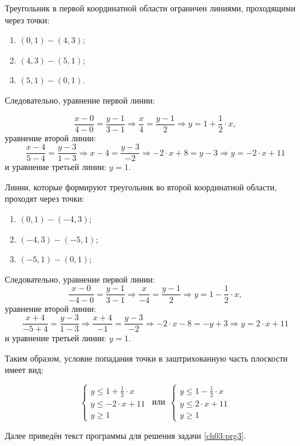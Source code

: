 Треугольник в первой координатной области ограничен линиями, проходящими через точки:

\begin{enumerate}
\item $(0, 1) - (4, 3)$;
\item $(4, 3) - (5, 1)$;
\item $(5, 1) - (0, 1)$.
\end{enumerate}
Следовательно, уравнение первой линии:

 $$\frac{x-0}{4-0}=\frac{y-1}{3-1}\Rightarrow \frac{x}{4}=\frac{y-1}{2}\Rightarrow y=1+\frac{1}{2}\cdot x,$$
уравнение второй линии:
$$
\frac{x-4}{5-4}=\frac{y-3}{1-3}\Rightarrow x-4=\frac{y-3}{-2}\Rightarrow -2\cdot x+8=y-3\Rightarrow y=-2\cdot x+11
$$
и уравнение третьей линии:  $y=1$.

Линии, которые формируют треугольник во второй координатной области, проходят через точки:

\begin{enumerate}
\item $(0, 1) - (-4, 3)$;
\item $(-4, 3) - (-5, 1)$;
\item $(-5, 1) - (0, 1)$;
\end{enumerate}
Следовательно, уравнение первой линии:
 $$\frac{x-0}{-4-0}=\frac{y-1}{3-1}\Rightarrow \frac{x}{-4}=\frac{y-1}{2}\Rightarrow y=1-\frac{1}{2}\cdot x,$$
уравнение второй линии:
$$
\frac{x+4}{-5+4}=\frac{y-3}{1-3}\Rightarrow \frac{x+4}{-1}=\frac{y-3}{-2}\Rightarrow -2\cdot x-8=-y+3\Rightarrow
y=2\cdot x+11
$$
и уравнение третьей линии:  $y=1$.

Таким образом, условие попадания точки в заштрихованную часть плоскости имеет вид:

\begin{equation*}
\left\{
\begin{array}{c}
y\leqslant 1+\frac{1}{2}\cdot x\\
y\leqslant -2\cdot x+11\\
y\geqslant 1
\end{array}%
\right.
\ \ \text{или}\ \  
\left\{
\begin{array}{c}
y\leqslant 1-\frac{1}{2}\cdot x\\
y\leqslant 2\cdot x+11\\
y\geqslant 1
\end{array}
\right. 
\end{equation*}

Далее приведён текст программы для решения задачи \ref{ch03:prg3}.

